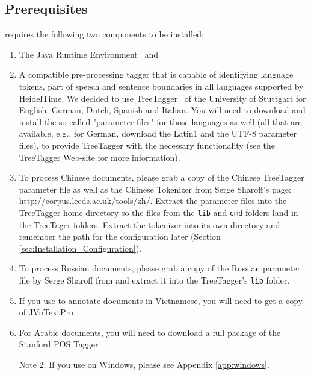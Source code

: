 \subsection{Prerequisites}\label{sec:Installation_Prerequisites}
\product{} requires the following two components to be installed:
\begin{enumerate}
\item The Java Runtime Environment~\cite{Java} and
\item A compatible pre-processing tagger that is capable of identifying language tokens, part of speech and sentence boundaries in all languages supported by HeidelTime. We decided to use TreeTagger~\cite{TreeTagger} of the University of Stuttgart for English, German, Dutch, Spanish and Italian. You will need to download and install the so called "parameter files" for those languages as well (all that are available, e.g., for German, download the Latin1 and the UTF-8 parameter files), to provide TreeTagger with the necessary functionality (see the TreeTagger Web-site for more information).
\item To process Chinese documents, please grab a copy of the Chinese TreeTagger parameter file as well as the Chinese Tokenizer from Serge Sharoff's page: \url{http://corpus.leeds.ac.uk/tools/zh/}. Extract the parameter files into the TreeTagger home directory so the files from the \texttt{lib} and \texttt{cmd} folders land in the TreeTager folders. Extract the tokenizer into its own directory and remember the path for the configuration later (Section \ref{sec:Installation_Configuration}).
\item To process Russian documents, please grab a copy of the Russian parameter file by Serge Sharoff from \url{} and extract it into the TreeTagger's \texttt{lib} folder.
\item If you use \product{} to annotate documents in Vietnamese, you will need to get a copy of JVnTextPro~\cite{JVnTextPro}
\item For Arabic documents, you will need to download a full package of the Stanford POS Tagger~\cite{StanfordPOSTagger}

Note 2: If you use \product{} on Windows, please see Appendix \ref{app:windows}.
\end{enumerate}

